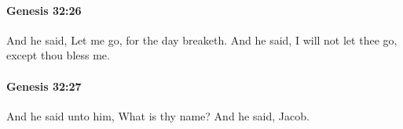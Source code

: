		\paragraph{Genesis 32:26} %
			\label{GENESIS-32-26}

			And he said, Let me go, for the day breaketh. And he said, I will not let thee go, except thou bless me.


		\paragraph{Genesis 32:27} %
			\label{GENESIS-32-27}

			And he said unto him, What is thy name? And he said, Jacob.


